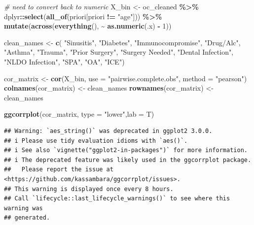 \documentclass[
]{article}
\newenvironment{Shaded}{\begin{snugshade}}{\end{snugshade}}
\newcommand{\AttributeTok}[1]{\textcolor[rgb]{0.13,0.29,0.53}{#1}}
\newcommand{\CommentTok}[1]{\textcolor[rgb]{0.56,0.35,0.01}{\textit{#1}}}
\newcommand{\DecValTok}[1]{\textcolor[rgb]{0.00,0.00,0.81}{#1}}
\newcommand{\FunctionTok}[1]{\textcolor[rgb]{0.13,0.29,0.53}{\textbf{#1}}}
\newcommand{\NormalTok}[1]{#1}
\newcommand{\OtherTok}[1]{\textcolor[rgb]{0.56,0.35,0.01}{#1}}
\newcommand{\SpecialCharTok}[1]{\textcolor[rgb]{0.81,0.36,0.00}{\textbf{#1}}}
\newcommand{\StringTok}[1]{\textcolor[rgb]{0.31,0.60,0.02}{#1}}
\begin{document}
\begin{Shaded}
\begin{Highlighting}[]
\CommentTok{\# need to convert back to numeric}
\NormalTok{X\_bin }\OtherTok{\textless{}{-}}\NormalTok{ oc\_cleaned }\SpecialCharTok{\%\textgreater{}\%}
\NormalTok{  dplyr}\SpecialCharTok{::}\FunctionTok{select}\NormalTok{(}\FunctionTok{all\_of}\NormalTok{(priori[priori }\SpecialCharTok{!=} \StringTok{"age"}\NormalTok{])) }\SpecialCharTok{\%\textgreater{}\%}
  \FunctionTok{mutate}\NormalTok{(}\FunctionTok{across}\NormalTok{(}\FunctionTok{everything}\NormalTok{(), }\SpecialCharTok{\textasciitilde{}} \FunctionTok{as.numeric}\NormalTok{(.x) }\SpecialCharTok{{-}} \DecValTok{1}\NormalTok{))}

\NormalTok{clean\_names }\OtherTok{\textless{}{-}} \FunctionTok{c}\NormalTok{(}
  \StringTok{"Sinusitis"}\NormalTok{, }\StringTok{"Diabetes"}\NormalTok{, }\StringTok{"Immunocompromise"}\NormalTok{, }\StringTok{"Drug/Alc"}\NormalTok{,}
  \StringTok{"Asthma"}\NormalTok{, }\StringTok{"Trauma"}\NormalTok{, }\StringTok{"Prior Surgery"}\NormalTok{, }\StringTok{"Surgery Needed"}\NormalTok{,}
  \StringTok{"Dental Infection"}\NormalTok{, }\StringTok{"NLDO Infection"}\NormalTok{, }\StringTok{"SPA"}\NormalTok{, }\StringTok{"OA"}\NormalTok{, }\StringTok{"ICE"}\NormalTok{)}

\NormalTok{cor\_matrix }\OtherTok{\textless{}{-}} \FunctionTok{cor}\NormalTok{(X\_bin, }\AttributeTok{use =} \StringTok{"pairwise.complete.obs"}\NormalTok{, }\AttributeTok{method =} \StringTok{"pearson"}\NormalTok{)}
\FunctionTok{colnames}\NormalTok{(cor\_matrix) }\OtherTok{\textless{}{-}}\NormalTok{ clean\_names}
\FunctionTok{rownames}\NormalTok{(cor\_matrix) }\OtherTok{\textless{}{-}}\NormalTok{ clean\_names}

\FunctionTok{ggcorrplot}\NormalTok{(cor\_matrix, }\AttributeTok{type =} \StringTok{"lower"}\NormalTok{,}\AttributeTok{lab =}\NormalTok{ T)}
\end{Highlighting}
\end{Shaded}

\begin{verbatim}
## Warning: `aes_string()` was deprecated in ggplot2 3.0.0.
## i Please use tidy evaluation idioms with `aes()`.
## i See also `vignette("ggplot2-in-packages")` for more information.
## i The deprecated feature was likely used in the ggcorrplot package.
##   Please report the issue at <https://github.com/kassambara/ggcorrplot/issues>.
## This warning is displayed once every 8 hours.
## Call `lifecycle::last_lifecycle_warnings()` to see where this warning was
## generated.
\end{verbatim}
\end{document}
